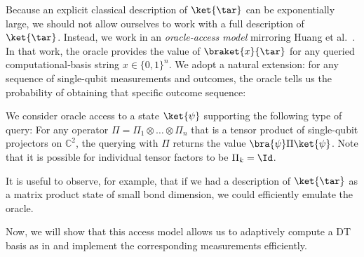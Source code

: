 Because an explicit classical description of $\ket{\tar}$ can be exponentially large, we should not allow ourselves to work with a full description of $\ket{\tar}$. Instead, we work in an \emph{oracle-access model} mirroring Huang et al.~\cite{huang2024certifying}. In that work, the oracle provides the value of $\braket{x}{\tar}$ for any queried computational‑basis string $x\in\{0,1\}^{n}$.  We adopt a natural extension: for any sequence of single-qubit measurements and outcomes, the oracle tells us the probability of obtaining that specific outcome sequence:


\begin{definition}\label{def:access model}
We consider oracle access to a state
$\ket{\psi}$  supporting the following type of query: For any operator $\Pi=\Pi_1\otimes\dots\otimes \Pi_n$ that is a tensor product of single-qubit projectors on $\mathbb{C}^{2}$, the querying with $\Pi$ returns the value $\bra{\psi} \Pi \ket{\psi}$. Note that it is possible for individual tensor factors to be $\Pi_k=\Id$.
\end{definition}

It is useful to observe, for example, that if we had a description of $\ket{\tar}$ as a matrix product state of small bond dimension, we could efficiently emulate the oracle.

Now, we will show that this access model allows us to adaptively compute a DT basis as in  and implement the corresponding measurements efficiently.%


